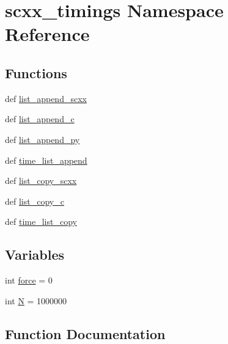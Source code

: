 \hypertarget{namespacescxx__timings}{}\section{scxx\+\_\+timings Namespace Reference}
\label{namespacescxx__timings}
\subsection*{Functions}
\begin{DoxyCompactItemize}
\item 
def \hyperlink{namespacescxx__timings_a51ceff5b5e8c5089fac5203a22c43edd}{list\+\_\+append\+\_\+scxx}
\item 
def \hyperlink{namespacescxx__timings_a6adbdb8821ca87c0dc825307e28c3a45}{list\+\_\+append\+\_\+c}
\item 
def \hyperlink{namespacescxx__timings_ac45c573349e4a0bbf34d53087cc759c3}{list\+\_\+append\+\_\+py}
\item 
def \hyperlink{namespacescxx__timings_aa8628789c2434ace60fa15a53fc10f98}{time\+\_\+list\+\_\+append}
\item 
def \hyperlink{namespacescxx__timings_a05c3626b51e4bbd0ae35295ea1f54e29}{list\+\_\+copy\+\_\+scxx}
\item 
def \hyperlink{namespacescxx__timings_a355198a6a06a40c044e74791685301cc}{list\+\_\+copy\+\_\+c}
\item 
def \hyperlink{namespacescxx__timings_ac78b892e90fa185735a573076f9232b2}{time\+\_\+list\+\_\+copy}
\end{DoxyCompactItemize}
\subsection*{Variables}
\begin{DoxyCompactItemize}
\item 
int \hyperlink{namespacescxx__timings_a252679c0c67e8713522eeec3aac11cd4}{force} = 0
\item 
int \hyperlink{namespacescxx__timings_ae628334376a69f8c08b74a9130521396}{N} = 1000000
\end{DoxyCompactItemize}


\subsection{Function Documentation}
\hypertarget{namespacescxx__timings_a6adbdb8821ca87c0dc825307e28c3a45}{}
